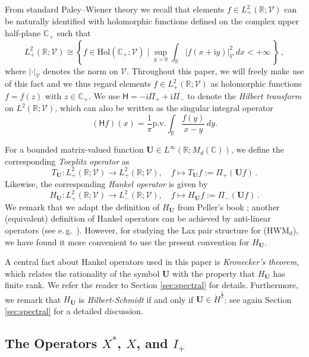 \documentclass[11pt,reqno]{amsart}
\theoremstyle{definition}
\theoremstyle{remark}
\theoremstyle{remark}
\numberwithin{equation}{section}
\newcommand{\C}{\mathbb{C}}
\newcommand{\R}{\mathbb{R}}
\newcommand{\VV}{\mathcal{V}}
\newcommand{\ii}{\mathrm{i}}
\newcommand{\Hil}{\mathsf{H}}
\newcommand{\Ub}{\mathbf{U}}
\begin{document}
From standard Paley--Wiener theory we recall that elements $f \in L^2_+(\R; \VV)$ can be naturally identified with holomorphic functions defined on the complex upper half-plane $\C_+$ such that
$$
L^2_+(\R; \VV) \cong\left \{ f \in \mathrm{Hol}(\C_+; \VV) \mid \sup_{y >0} \int_{\R} |f(x+ \ii y)|_\VV ^2 \, dx < +\infty \, \right \} \,  ,
$$ 
where $|\cdot|_\VV$ denotes the norm on $\VV$. Throughout this paper, we will freely make use of this fact and we thus regard elements $f \in L^2_+(\R; \VV)$ as holomorphic functions $f=f(z)$ with $z \in \C_+$. We use $\Hil = -\ii \Pi_+ + \ii \Pi_-$ to denote the {\em Hilbert transform} on $L^2(\R;\VV)$, which can also be written as the singular integral operator
$$
(\Hil f)(x) = \frac{1}{\pi} \mathrm{p.v.} \int_\R \frac{f(y)}{x-y} \, dy.
$$

\medskip
For a bounded matrix-valued function $\Ub \in L^\infty(\R; M_d(\C))$, we define the corresponding {\em Toeplitz operator} as
$$
T_\Ub : L^2_+(\R; \VV) \to L^2_+(\R;\VV), \quad f \mapsto T_\Ub f := \Pi_+(\Ub f) \, .
$$
Likewise, the corresponding {\em Hankel operator} is given by
$$
H_\Ub : L^2_+(\R; \VV) \to L^2_-(\R; \VV), \quad f \mapsto H_{\Ub} f := \Pi_-(\Ub f ) \, .
$$
We remark that we adapt the definition of $H_\Ub$ from Peller's book \cite{Pe-03}; another (equivalent) definition of Hankel operators can be achieved by anti-linear operators (see e.\,g.~\cite{GePu-24}). However, for studying the Lax pair structure for (HWM$_d$), we have found it more convenient to use the present convention for $H_\Ub$.

A central fact about Hankel operators used in this paper is  {\em Kronecker's theorem}, which relates the rationality of the symbol $\Ub$ with the property that $H_{\Ub}$ has finite rank. We refer the reader to Section \ref{sec:spectral} for details.  Furthermore, we remark that $H_\Ub$ is {\em Hilbert-Schmidt} if and only if $\Ub \in \dot{H}^{\frac 1 2}$; see again Section \ref{sec:spectral} for a detailed discussion.




\subsection*{The Operators $X^*$, $X$, and $I_+$}
\end{document}
